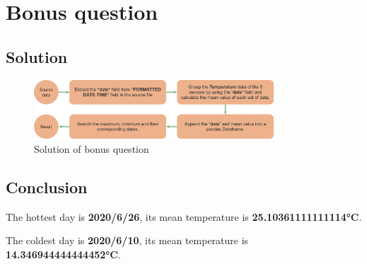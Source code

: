\documentclass[a4paper]{article}
\begin{document}
\section{Bonus question}
\subsection{Solution}
\begin{figure}[H]
\centering
\includegraphics[width=0.8\textwidth]{images/BQ_solution.png} 
\caption{Solution of bonus question}
\end{figure}

\subsection{Conclusion}
\noindent The hottest day is \textbf{2020/6/26}, its mean temperature is \textbf{25.10361111111114°C}.  

\noindent The coldest day is \textbf{2020/6/10}, its mean temperature is \textbf{14.346944444444452°C}.




\end{document}
